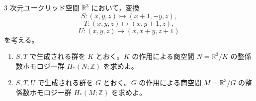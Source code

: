 \newcommand{\C}{\mathbb{C}}
\newcommand{\R}{\mathbb{R}}
\newcommand{\Z}{\mathbb{Z}}
\newcommand{\Tr}{\operatorname{Tr}}
\newcommand{\Impart}{\operatorname{Im}}
\newcommand{\AF}{\operatorname{AF}}
\newcommand{\AX}{\operatorname{AX}}
\newcommand{\GL}{\operatorname{GL}}


\(3\) 次元ユークリッド空間 \(\R^3\) において，変換
\[
  S:(x,y,z)\mapsto (x+1,-y,z),
\]
\[
  T:(x,y,z)\mapsto (x,y+1,z),
\]
\[
  U:(x,y,z)\mapsto (x,x+y,z+1)
\]
を考える。

\begin{enumerate}
  \item \(S,T\) で生成される群を \(K\) とおく。\(K\) の作用による商空間
  \(N=\R^3/K\) の整係数ホモロジー群 \(H_*(N;\Z)\) を求めよ。
  \item \(S,T,U\) で生成される群を \(G\) とおく。\(G\) の作用による商空間
  \(M=\R^3/G\) の整係数ホモロジー群 \(H_*(M;\Z)\) を求めよ。
\end{enumerate}

%